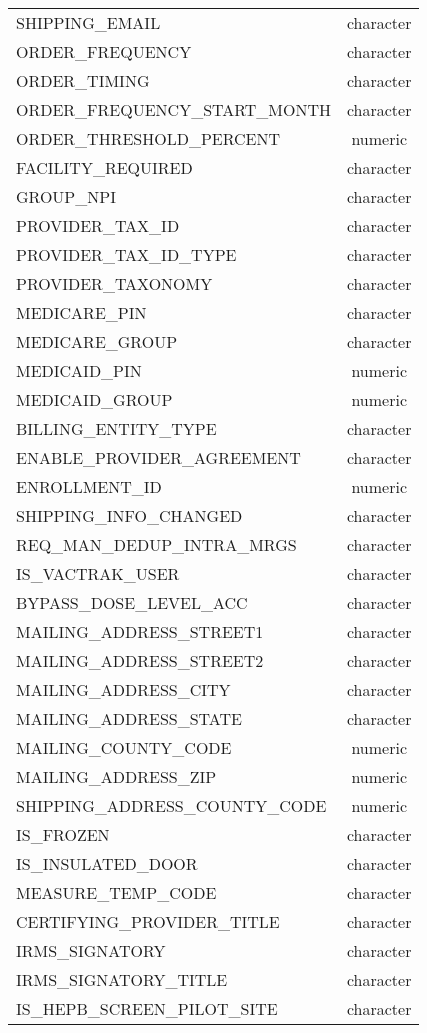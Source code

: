 \documentclass[
  letterpaper,
  DIV=11,
  numbers=noendperiod]{scrreprt}
\begin{document}
\begin{longtable}{lc}
SHIPPING\_EMAIL & character \\ 
ORDER\_FREQUENCY & character \\ 
ORDER\_TIMING & character \\ 
ORDER\_FREQUENCY\_START\_MONTH & character \\ 
ORDER\_THRESHOLD\_PERCENT & numeric \\ 
FACILITY\_REQUIRED & character \\ 
GROUP\_NPI & character \\ 
PROVIDER\_TAX\_ID & character \\ 
PROVIDER\_TAX\_ID\_TYPE & character \\ 
PROVIDER\_TAXONOMY & character \\ 
MEDICARE\_PIN & character \\ 
MEDICARE\_GROUP & character \\ 
MEDICAID\_PIN & numeric \\ 
MEDICAID\_GROUP & numeric \\ 
BILLING\_ENTITY\_TYPE & character \\ 
ENABLE\_PROVIDER\_AGREEMENT & character \\ 
ENROLLMENT\_ID & numeric \\ 
SHIPPING\_INFO\_CHANGED & character \\ 
REQ\_MAN\_DEDUP\_INTRA\_MRGS & character \\ 
IS\_VACTRAK\_USER & character \\ 
BYPASS\_DOSE\_LEVEL\_ACC & character \\ 
MAILING\_ADDRESS\_STREET1 & character \\ 
MAILING\_ADDRESS\_STREET2 & character \\ 
MAILING\_ADDRESS\_CITY & character \\ 
MAILING\_ADDRESS\_STATE & character \\ 
MAILING\_COUNTY\_CODE & numeric \\ 
MAILING\_ADDRESS\_ZIP & numeric \\ 
SHIPPING\_ADDRESS\_COUNTY\_CODE & numeric \\ 
IS\_FROZEN & character \\ 
IS\_INSULATED\_DOOR & character \\ 
MEASURE\_TEMP\_CODE & character \\ 
CERTIFYING\_PROVIDER\_TITLE & character \\ 
IRMS\_SIGNATORY & character \\ 
IRMS\_SIGNATORY\_TITLE & character \\ 
IS\_HEPB\_SCREEN\_PILOT\_SITE & character \\ 

\end{longtable}
\end{document}
